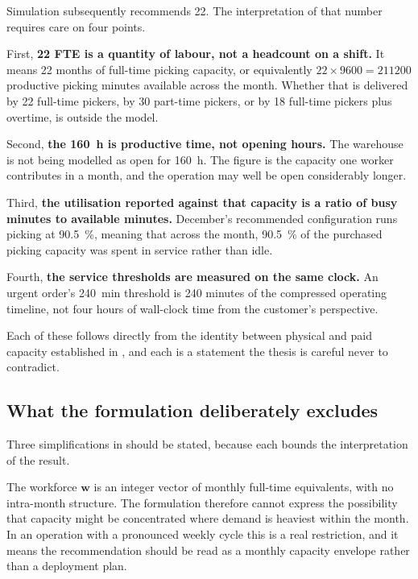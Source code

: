 Simulation subsequently recommends 22. The interpretation of that number requires care on four
points.

First, \textbf{22 FTE is a quantity of labour, not a headcount on a shift.} It means 22
months of full-time picking capacity, or equivalently \(22 \times \num{9600} =
\num{211200}\) productive picking minutes available across the month. Whether that is delivered
by 22 full-time pickers, by 30 part-time pickers, or by 18 full-time pickers plus overtime, is
outside the model.

Second, \textbf{the \SI{160}{\hour} is productive time, not opening hours.} The warehouse is not
being modelled as open for \SI{160}{\hour}. The figure is the capacity one worker contributes in
a month, and the operation may well be open considerably longer.

Third, \textbf{the utilisation reported against that capacity is a ratio of busy minutes to
available minutes.} December's recommended configuration runs picking at
\SI{90.5}{\percent}, meaning that across the month, \SI{90.5}{\percent} of the purchased picking
capacity was spent in service rather than idle.

Fourth, \textbf{the service thresholds are measured on the same clock.} An urgent order's
\SI{240}{\minute} threshold is 240 minutes of the compressed operating timeline, not four hours
of wall-clock time from the customer's perspective.

Each of these follows directly from the identity between physical and paid capacity established
in , and each is a statement the thesis is careful never to
contradict.

\subsection{What the formulation deliberately excludes}

Three simplifications in  should be stated, because each bounds the
interpretation of the result.

The workforce \(\mathbf{w}\) is an integer vector of monthly full-time equivalents, with no
intra-month structure. The formulation therefore cannot express the possibility that capacity
might be concentrated where demand is heaviest within the month. In an operation with a
pronounced weekly cycle this is a real restriction, and it means the recommendation should be
read as a monthly capacity envelope rather than a deployment plan.

